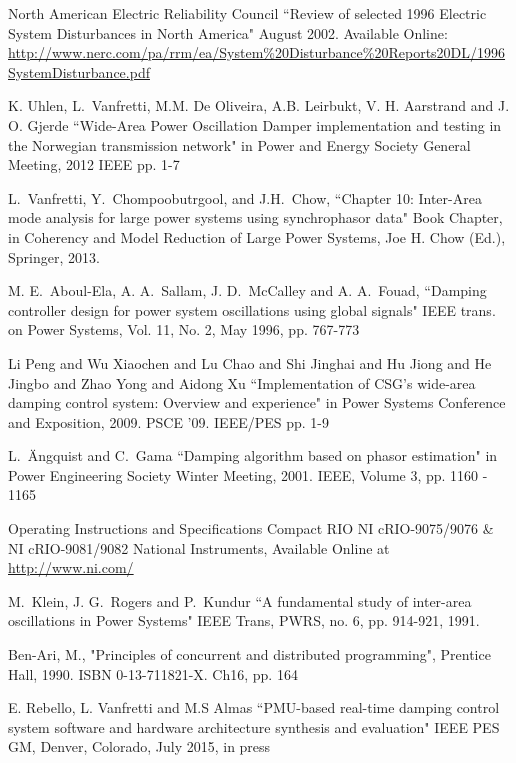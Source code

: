 \documentclass[a4paper, 10 pt, conference]{IEEEtran}
\begin{document}
\begin{thebibliography}{1}

 North American Electric Reliability Council ``Review of selected 1996 Electric System Disturbances in North America" August 2002. Available Online: \url{http://www.nerc.com/pa/rrm/ea/System\%20Disturbance\%20Reports20DL/1996SystemDisturbance.pdf}

 K. Uhlen, L.~Vanfretti, M.M. De Oliveira, A.B. Leirbukt, V. H. Aarstrand and J. O. Gjerde ``Wide-Area Power Oscillation Damper implementation and testing in the Norwegian transmission network" in Power and Energy Society General Meeting, 2012 IEEE pp. 1-7

  L.~Vanfretti, Y.~Chompoobutrgool, and J.H.~Chow, ``Chapter 10: Inter-Area mode analysis for large power systems using synchrophasor data" Book Chapter, in Coherency and Model Reduction of Large Power Systems, Joe H. Chow (Ed.), Springer, 2013.

  M. E.~Aboul-Ela, A. A.~Sallam, J. D.~McCalley and A. A.~Fouad, ``Damping controller design for power system oscillations using global signals" IEEE trans. on Power Systems, Vol. 11, No. 2, May 1996, pp. 767-773

 Li Peng and Wu Xiaochen and Lu Chao and Shi Jinghai and Hu Jiong and He Jingbo and Zhao Yong and Aidong Xu ``Implementation of CSG's wide-area damping control system: Overview and experience" in Power Systems Conference and Exposition, 2009. PSCE '09. IEEE/PES pp. 1-9

 L.~\"{A}ngquist and C.~Gama ``Damping algorithm based on phasor estimation" in Power Engineering Society Winter Meeting, 2001. IEEE, Volume 3, pp. 1160 - 1165

 Operating Instructions and Specifications Compact RIO NI cRIO-9075/9076 \& NI cRIO-9081/9082 National Instruments, Available Online at \url{http://www.ni.com/}

 M.~Klein, J. G.~Rogers and P.~Kundur ``A fundamental study of inter-area oscillations in Power Systems" IEEE Trans, PWRS, no. 6, pp. 914-921, 1991.

 Ben-Ari, M., "Principles of concurrent and distributed programming", Prentice Hall, 1990. ISBN 0-13-711821-X. Ch16, pp. 164

 E. Rebello, L. Vanfretti and M.S Almas ``PMU-based real-time damping control system software and hardware architecture synthesis and evaluation" IEEE PES GM, Denver, Colorado, July 2015, in press


\end{thebibliography}
\end{document}
